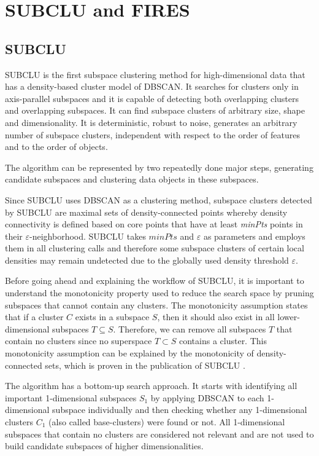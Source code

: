 \section{SUBCLU and FIRES}\raggedbottom

\subsection{SUBCLU}
SUBCLU \citep{subclu} is the first subspace clustering method for high-dimensional data that has a density-based cluster model of DBSCAN. It searches for clusters only in axis-parallel subspaces and it is capable of detecting both overlapping clusters and overlapping subspaces. It can find subspace clusters of arbitrary size, shape and dimensionality. It is deterministic, robust to noise, generates an arbitrary number of subspace clusters, independent with respect to the order of features and to the order of objects. 

The algorithm can be represented by two repeatedly done major steps, generating candidate subspaces and clustering data objects in these subspaces.

Since SUBCLU uses DBSCAN \citep{10.5555/3001460.3001507} as a clustering method, subspace clusters detected by SUBCLU are maximal sets of density-connected points whereby density connectivity is defined based on core points that have at least \textit{minPts} points in their $\varepsilon$-neighborhood. SUBCLU takes $minPts$ and $\varepsilon$ as parameters and employs them in all clustering calls and therefore some subspace clusters of certain local densities may remain undetected due to the globally used density threshold $\varepsilon$.

Before going ahead and explaining the workflow of SUBCLU, it is important to understand the monotonicity property used to reduce the search space by pruning subspaces that cannot contain any clusters. The monotonicity assumption states that if a cluster $C$ exists in a subspace $S$, then it should also exist in all lower-dimensional subspaces $T \subseteq S$. Therefore, we can remove all subspaces $T$ that contain no clusters since no superspace $T \subset S$ contains a cluster. This monotonicity assumption can be explained by the monotonicity of density-connected sets, which is proven in the publication of SUBCLU \citep{subclu}.

The algorithm has a bottom-up search approach. It starts with identifying all important 1-dimensional subspaces $S_{1}$ by applying DBSCAN to each 1-dimensional subspace individually and then checking whether any 1-dimensional clusters $C_{1}$ (also called base-clusters) were found or not. All 1-dimensional subspaces that contain no clusters are considered not relevant and are not used to build candidate subspaces of higher dimensionalities. 

